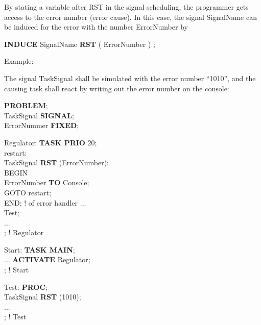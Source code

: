 By stating a variable after RST in the signal scheduling, the programmer
gets access to the error number (error cause). In this case, the signal
SignalName can be induced for the error with the number ErrorNumber by

{\bf INDUCE} SignalName {\bf RST} ( ErrorNumber ) ;

Example:

The signal TaskSignal shall be simulated with the error number
``1010'', and the causing task shall react by writing out the error
number on the console:

{\bf PROBLEM};\\
 TaskSignal {\bf SIGNAL};\\
 ErrorNummer {\bf FIXED};

Regulator: {\bf TASK PRIO} 20;\\
restart:\\
 TaskSignal {\bf RST} (ErrorNumber):\\
\x \x BEGIN \\
\x \x {} ErrorNumber {\bf TO} Console;\\
\x \x \x GOTO restart;\\
\x \x END;  ! of error handler
\x \x ...\\
 Test;\\
\x \x ...\\
; ! Regulator

Start: {\bf TASK MAIN};\\
 ... {\bf ACTIVATE} Regulator;\\   %
; ! Start

Test: {\bf PROC};\\
 TaskSignal {\bf RST} (1010);\\
\x ...\\
; ! Test


